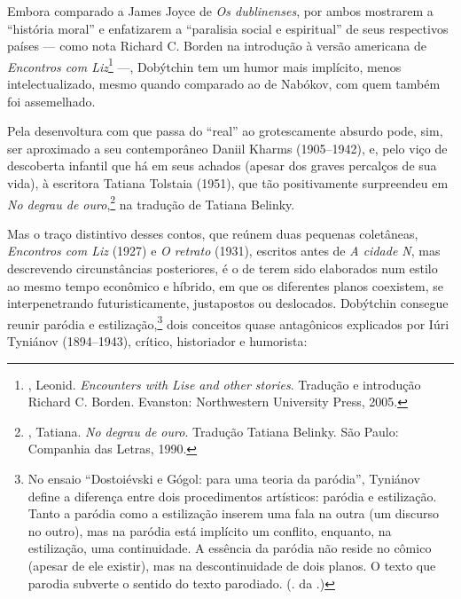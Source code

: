 Embora comparado a James Joyce de \emph{Os dublinenses}, por ambos
mostrarem a ``história moral'' e enfatizarem a ``paralisia social e
espiritual'' de seus respectivos países --- como nota Richard C. Borden
na introdução à versão americana de \emph{Encontros com Liz}\footnote{,
  Leonid. \emph{Encounters with Lise and other stories}. Tradução e
  introdução Richard C. Borden. Evanston: Northwestern University Press,
  2005.} ---, Dobýtchin tem um humor mais implícito, menos
intelectualizado, mesmo quando comparado ao de Nabókov, com quem também
foi assemelhado.

Pela desenvoltura com que passa do ``real'' ao grotescamente absurdo
pode, sim, ser aproximado a seu contemporâneo Daniil Kharms (1905--1942),
e, pelo viço de descoberta infantil que há em seus achados (apesar dos
graves percalços de sua vida), à escritora Tatiana Tolstaia (1951), que
tão positivamente surpreendeu em \emph{No degrau de ouro},\footnote{,
  Tatiana. \emph{No degrau de ouro}. Tradução Tatiana Belinky. São
  Paulo: Companhia das Letras, 1990.} na tradução de Tatiana Belinky.

Mas o traço distintivo desses contos, que reúnem duas pequenas
coletâneas, \emph{Encontros com Liz} (1927) e \emph{O retrato} (1931),
escritos antes de \emph{A cidade N}, mas descrevendo circunstâncias
posteriores, é o de terem sido elaborados num estilo ao mesmo tempo
econômico e híbrido, em que os diferentes planos coexistem, se
interpenetrando futuristicamente, justapostos ou deslocados. Dobýtchin
consegue reunir paródia e estilização,\footnote{No ensaio ``Dostoiévski e Gógol: para uma teoria da paródia'', Tyniánov define a diferença entre dois procedimentos artísticos: paródia e estilização. Tanto a paródia como a estilização inserem uma fala na outra (um discurso no outro), mas na paródia está implícito um conflito, enquanto, na estilização, uma continuidade. A essência da paródia não reside no cômico (apesar de ele existir), mas na descontinuidade de dois planos. O texto que parodia subverte o sentido do texto parodiado. (. da .)} dois conceitos quase antagônicos explicados por Iúri Tyniánov (1894--1943), crítico, historiador e
humorista:

